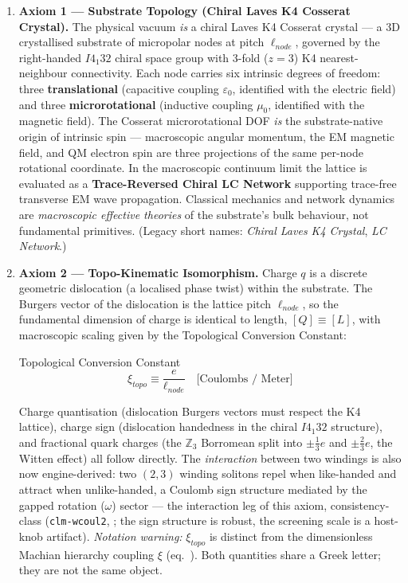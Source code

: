 \begin{enumerate}
    \item \textbf{Axiom 1 --- Substrate Topology (Chiral Laves K4 Cosserat Crystal).} The physical vacuum \emph{is} a chiral Laves K4 Cosserat crystal --- a 3D crystallised substrate of micropolar nodes at pitch $\ell_{node}$, governed by the right-handed $I4_1 32$ chiral space group with 3-fold ($z=3$) K4 nearest-neighbour connectivity. Each node carries six intrinsic degrees of freedom: three \textbf{translational} (capacitive coupling $\varepsilon_0$, identified with the electric field) and three \textbf{microrotational} (inductive coupling $\mu_0$, identified with the magnetic field). The Cosserat microrotational DOF \emph{is} the substrate-native origin of intrinsic spin --- macroscopic angular momentum, the EM magnetic field, and QM electron spin are three projections of the same per-node rotational coordinate. In the macroscopic continuum limit the lattice is evaluated as a \textbf{Trace-Reversed Chiral LC Network} supporting trace-free transverse EM wave propagation. Classical mechanics and network dynamics are \textit{macroscopic effective theories} of the substrate's bulk behaviour, not fundamental primitives. (Legacy short names: \emph{Chiral Laves K4 Crystal}, \emph{LC Network}.) %

    \item \textbf{Axiom 2 --- Topo-Kinematic Isomorphism.} Charge $q$ is a discrete geometric dislocation (a localised phase twist) within the substrate. The Burgers vector of the dislocation is the lattice pitch $\ell_{node}$, so the fundamental dimension of charge is identical to length, $[Q] \equiv [L]$, with macroscopic scaling given by the Topological Conversion Constant:
    \begin{resultbox}{Topological Conversion Constant}
    \begin{equation}
        \xi_{topo} \equiv \frac{e}{\ell_{node}} \quad \text{[Coulombs / Meter]}
    \end{equation}
    \end{resultbox}
    Charge quantisation (dislocation Burgers vectors must respect the K4 lattice), charge sign (dislocation handedness in the chiral $I4_1 32$ structure), and fractional quark charges (the $\mathbb{Z}_3$ Borromean split into $\pm\tfrac{1}{3}e$ and $\pm\tfrac{2}{3}e$, the Witten effect) all follow directly. The \emph{interaction} between two windings is also now engine-derived: two $(2,3)$ winding solitons repel when like-handed and attract when unlike-handed, a Coulomb sign structure mediated by the gapped rotation ($\omega$) sector --- the interaction leg of this axiom, consistency-class (\texttt{clm-wcoul2}, ; the sign structure is robust, the screening scale is a host-knob artifact). \emph{Notation warning:} $\xi_{topo}$ is distinct from the dimensionless Machian hierarchy coupling $\xi$ (eq.~). Both quantities share a Greek letter; they are not the same object.


\end{enumerate}
